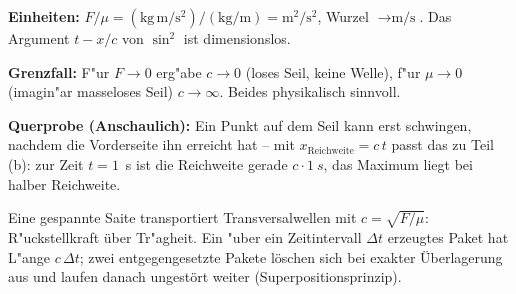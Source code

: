 \begin{kontrolle}
\textbf{Einheiten:} $F/\mu=(\mathrm{kg\,m/s^2})/(\mathrm{kg/m})=\mathrm{m^2/s^2}$,
Wurzel $\rightarrow\unit{\metre\per\second}$. Das Argument $t-x/c$ von
$\sin^2$ ist dimensionslos. \checkmark

\textbf{Grenzfall:} F"ur $F\rightarrow0$ erg"abe $c\rightarrow0$ (loses Seil,
keine Welle), f"ur $\mu\rightarrow0$ (imagin"ar masseloses Seil) $c\rightarrow
\infty$. Beides physikalisch sinnvoll. \checkmark

\textbf{Querprobe (Anschaulich):} Ein Punkt auf dem Seil kann erst schwingen,
nachdem die Vorderseite ihn erreicht hat -- mit
$x_{\text{Reichweite}}=c\,t$ passt das zu Teil (b): zur Zeit $t=1$~s ist die
Reichweite gerade $c\cdot\qty{1}{s}$, das Maximum liegt bei halber Reichweite.
\checkmark
\end{kontrolle}

\begin{merksatz}
Eine gespannte Saite transportiert Transversalwellen mit
$c=\sqrt{F/\mu}$: R"uckstellkraft über Tr"agheit. Ein "uber ein Zeitintervall
$\Delta t$ erzeugtes Paket hat L"ange $c\,\Delta t$; zwei entgegengesetzte
Pakete löschen sich bei exakter Überlagerung aus und laufen danach ungestört
weiter (Superpositionsprinzip).
\end{merksatz}
